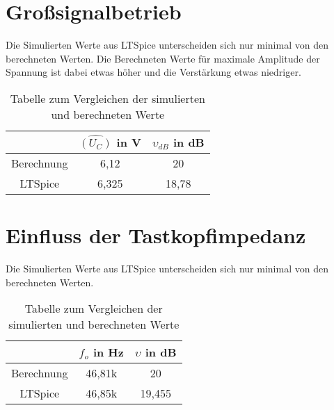         \section{Großsignalbetrieb}
Die Simulierten Werte aus LTSpice unterscheiden sich nur minimal von den berechneten Werten. Die Berechneten Werte für maximale Amplitude der Spannung ist dabei etwas höher und die Verstärkung etwas niedriger.   
        \begin{table}[h!]
            \centering
            \caption{Tabelle zum Vergleichen der simulierten und berechneten Werte}
            \begin{tabular}{| c | c | c |} 
                \hline
  & $\hat{(U_C)}$ in V &  $\upsilon_{dB}$ in dB   \\
                \hline
                Berechnung & 6,12 & 20  \\ 
                \hline
                LTSpice & 6,325 & 18,78 \\
                \hline
            \end{tabular}
            \label{tab:großsignal}
        \end{table}
        
        \section{Einfluss der Tastkopfimpedanz}
        
        Die Simulierten Werte aus LTSpice unterscheiden sich nur minimal von den berechneten Werten.        
        \begin{table}[h!]
            \centering
            \caption{Tabelle zum Vergleichen der simulierten und berechneten Werte}
            \begin{tabular}{| c | c | c |} 
                \hline
  & $f_o$ in Hz & $\upsilon$ in dB  \\
                \hline
                Berechnung & 46,81k & 20 \\ 
                \hline
                LTSpice & 46,85k & 19,455 \\
                \hline
            \end{tabular}
            \label{tab:tastkopf}
        \end{table}
        